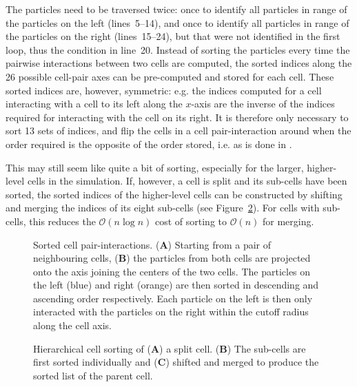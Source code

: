 \documentclass[final]{siamltex}
\newcommand{\oh}[1]
    {\mbox{$ {\mathcal O}( #1 ) $}}
\newcommand{\fig}[1]
    {Figure~\ref{fig:#1}}
\newcommand{\bsf}[1]
    {\textbf{\textsf{#1}}}
\begin{document}
The particles need to be traversed twice: once to identify
all particles in range of the particles on the left (lines~5--14), and
once to identify all particles in range of the particles on the
right (lines~15--24), but that were not identified in the first loop, 
thus the condition in line~20.
Instead of sorting the particles every time the
pairwise interactions between two cells are computed,
the sorted indices along the 26 possible cell-pair axes can be
pre-computed and stored for each cell.
These sorted indices are, however, symmetric: e.g. the indices
computed for a cell interacting with a cell to its left along the
$x$-axis are the inverse of the indices required for interacting 
with the cell on its right.
It is therefore only necessary to sort 13 sets of indices, and flip
the cells in a cell pair-interaction around when the order
required is the opposite of the order stored, i.e. as is
done in \cite{ref:Gonnet2013}.

This may still seem like quite a bit of sorting, especially
for the larger, higher-level cells in the simulation.
If, however, a cell is split and its sub-cells have been sorted,
the sorted indices of the higher-level cells can be constructed
by shifting and merging the indices of its eight sub-cells
(see \fig{HierarchySorting}).
For cells with sub-cells, this reduces the \oh{n\log{n}} cost of sorting
to \oh{n} for merging. 


\begin{figure}
    \centerline{}
    
    \caption{Sorted cell pair-interactions. ({\bsf A}) Starting from a pair of
        neighbouring cells, ({\bsf B}) the particles from both cells
        are projected onto the axis joining the centers of the two cells.
        The particles on the left (blue) and right (orange) are
        then sorted in descending and ascending order respectively.
        Each particle on the left is then only interacted with
        the particles on the right within the cutoff radius along the cell axis.
        }
    \label{fig:SortedInteractions}
\end{figure}


\begin{figure}
    \centerline{}
    
    \caption{Hierarchical cell sorting of ({\bsf A}) a split cell.
        ({\bsf B}) The sub-cells are first sorted individually and
        ({\bsf C}) shifted and merged to produce the sorted list
        of the parent cell.
        }
    \label{fig:HierarchySorting}
\end{figure}
\end{document}
